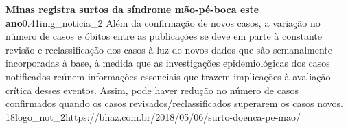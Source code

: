 \documentclass{article}
\newcommand{\cfbox}[2]{%
    \colorlet{currentcolor}{.}%
    {\color{#1}%
    \fbox{\color{currentcolor}#2}}%
}
\begin{document}
{\centering\large\textbf{Minas registra surtos da síndrome mão-pé-boca este ano}}{0.41}{img_noticia_2}{
Além da confirmação de novos casos, a variação no número de casos e óbitos entre as publicações se deve em parte à constante revisão e reclassificação dos casos à luz de novos dados que são semanalmente incorporadas à base, à medida que as investigações epidemiológicas dos casos notificados reúnem informações essenciais que trazem implicações à avaliação crítica desses eventos. Assim, pode haver redução no número de casos confirmados quando os casos revisados/reclassificados superarem os casos novos.
\vskip 0mm
}{18}{logo_not_2}{}{https://bhaz.com.br/2018/05/06/surto-doenca-pe-mao/} 









\end{document}
